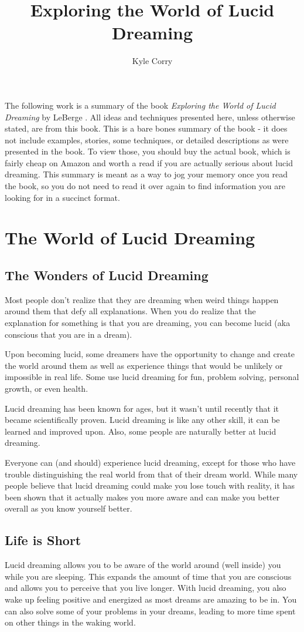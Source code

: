 \documentclass{article}
\title{Exploring the World of Lucid Dreaming}
\author{Kyle Corry}
\begin{document}
\maketitle
\newpage
\tableofcontents
\newpage
The following work is a summary of the book \textit{Exploring the World of Lucid Dreaming} by LeBerge \cite{leberge}. All ideas and techniques presented here, unless otherwise stated, are from this book. This is a bare bones summary of the book - it does not include examples, stories, some techniques, or detailed descriptions as were presented in the book. To view those, you should buy the actual book, which is fairly cheap on Amazon and worth a read if you are actually serious about lucid dreaming. This summary is meant as a way to jog your memory once you read the book, so you do not need to read it over again to find information you are looking for in a succinct format.
\section{The World of Lucid Dreaming}
\subsection{The Wonders of Lucid Dreaming}
Most people don't realize that they are dreaming when weird things happen around them that defy all explanations. When you do realize that the explanation for something is that you are dreaming, you can become lucid (aka conscious that you are in a dream).

Upon becoming lucid, some dreamers have the opportunity to change and create the world around them as well as experience things that would be unlikely or impossible in real life. Some use lucid dreaming for fun, problem solving, personal growth, or even health.

Lucid dreaming has been known for ages, but it wasn't until recently that it became scientifically proven. Lucid dreaming is like any other skill, it can be learned and improved upon. Also, some people are naturally better at lucid dreaming.

Everyone can (and should) experience lucid dreaming, except for those who have trouble distinguishing the real world from that of their dream world. While many people believe that lucid dreaming could make you lose touch with reality, it has been shown that it actually makes you more aware and can make you better overall as you know yourself better.

\subsection{Life is Short}
Lucid dreaming allows you to be aware of the world around (well inside) you while you are sleeping. This expands the amount of time that you are conscious and allows you to perceive that you live longer. With lucid dreaming, you also wake up feeling positive and energized as most dreams are amazing to be in. You can also solve some of your problems in your dreams, leading to more time spent on other things in the waking world.
\end{document}
